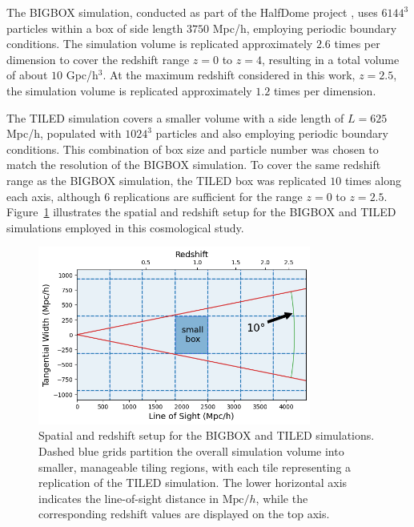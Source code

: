 The BIGBOX simulation, conducted as part of the HalfDome project \citep{2024arXiv240717462B}, uses $6144^3$ particles within a box of side length $3750$ Mpc/h, employing periodic boundary conditions. The simulation volume is replicated approximately $2.6$ times per dimension to cover the redshift range $z = 0$ to $z = 4$, resulting in a total volume of about $10$ Gpc/h$^3$. At the maximum redshift considered in this work, $z = 2.5$, the simulation volume is replicated approximately $1.2$ times per dimension.

The TILED simulation covers a smaller volume with a side length of $L = 625$ Mpc/h, populated with $1024^3$ particles and also employing periodic boundary conditions. This combination of box size and particle number was chosen to match the resolution of the BIGBOX simulation. To cover the same redshift range as the BIGBOX simulation, the TILED box was replicated $10$ times along each axis, although $6$ replications are sufficient for the range $z = 0$ to $z = 2.5$. Figure~\ref{fig:simulationsetting} illustrates the spatial and redshift setup for the BIGBOX and TILED simulations employed in this cosmological study.

\begin{figure}[ht]
    \centering
    \includegraphics[width=0.8\textwidth]{figures/light_cone_configuration.png}
    \caption[Spatial and redshift setup for the BIGBOX and TILED simulations]{Spatial and redshift setup for the BIGBOX and TILED simulations. Dashed blue grids partition the overall simulation volume into smaller, manageable tiling regions, with each tile representing a replication of the TILED simulation. The lower horizontal axis indicates the line-of-sight distance in $\mathrm{Mpc}/h$, while the corresponding redshift values are displayed on the top axis.} \label{fig:simulationsetting}
\end{figure}

